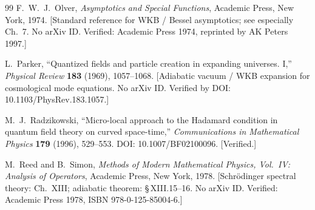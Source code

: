 \documentclass[11pt,a4paper]{article}
\theoremstyle{definition}
\begin{document}
\begin{thebibliography}{99}
  F.~W.~J.~Olver,
  \emph{Asymptotics and Special Functions},
  Academic Press, New York, 1974.
  [Standard reference for WKB / Bessel asymptotics; see especially Ch.~7.
   No arXiv ID. Verified: Academic Press 1974, reprinted by AK Peters 1997.]

  L.~Parker,
  ``Quantized fields and particle creation in expanding universes. I,''
  \emph{Physical Review} \textbf{183} (1969), 1057--1068.
  [Adiabatic vacuum / WKB expansion for cosmological mode equations.
   No arXiv ID. Verified by DOI: 10.1103/PhysRev.183.1057.]

  M.~J.~Radzikowski,
  ``Micro-local approach to the Hadamard condition in quantum field theory on
  curved space-time,''
  \emph{Communications in Mathematical Physics} \textbf{179} (1996), 529--553.
  DOI: 10.1007/BF02100096.
  [Verified.]

  M.~Reed and B.~Simon,
  \emph{Methods of Modern Mathematical Physics, Vol.~IV: Analysis of Operators},
  Academic Press, New York, 1978.
  [Schr\"odinger spectral theory: Ch.~XIII; adiabatic theorem: \S\,XIII.15--16.
   No arXiv ID. Verified: Academic Press 1978, ISBN 978-0-125-85004-6.]

\end{thebibliography}
\end{document}
